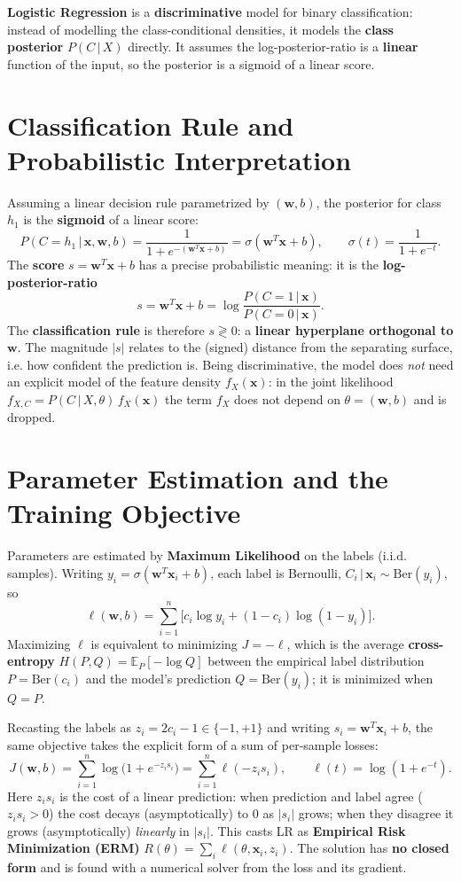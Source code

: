 \textbf{Logistic Regression} is a \textbf{discriminative} model for binary classification: instead of modelling the class-conditional densities, it models the \textbf{class posterior} $P(C\,|\,X)$ directly. It assumes the log-posterior-ratio is a \textbf{linear} function of the input, so the posterior is a sigmoid of a linear score.

\section*{Classification Rule and Probabilistic Interpretation}

Assuming a linear decision rule parametrized by $(\mathbf{w},b)$, the posterior for class $h_1$ is the \textbf{sigmoid} of a linear score:
\[
P(C{=}h_1\,|\,\mathbf{x},\mathbf{w},b)=\frac{1}{1+e^{-(\mathbf{w}^T\mathbf{x}+b)}}=\sigma(\mathbf{w}^T\mathbf{x}+b),\qquad \sigma(t)=\frac{1}{1+e^{-t}} .
\]
The \textbf{score} $s=\mathbf{w}^T\mathbf{x}+b$ has a precise probabilistic meaning: it is the \textbf{log-posterior-ratio}
\[
s=\mathbf{w}^T\mathbf{x}+b=\log\frac{P(C{=}1\,|\,\mathbf{x})}{P(C{=}0\,|\,\mathbf{x})} .
\]
The \textbf{classification rule} is therefore $s\gtrless 0$: a \textbf{linear hyperplane orthogonal to $\mathbf{w}$}. The magnitude $|s|$ relates to the (signed) distance from the separating surface, i.e. how confident the prediction is. Being discriminative, the model does \emph{not} need an explicit model of the feature density $f_X(\mathbf{x})$: in the joint likelihood $f_{X,C}=P(C\,|\,X,\theta)\,f_X(\mathbf{x})$ the term $f_X$ does not depend on $\theta=(\mathbf{w},b)$ and is dropped.

\section*{Parameter Estimation and the Training Objective}

Parameters are estimated by \textbf{Maximum Likelihood} on the labels (i.i.d. samples). Writing $y_i=\sigma(\mathbf{w}^T\mathbf{x}_i+b)$, each label is Bernoulli, $C_i\,|\,\mathbf{x}_i\sim\mathrm{Ber}(y_i)$, so
\[
\ell(\mathbf{w},b)=\sum_{i=1}^n\big[c_i\log y_i+(1-c_i)\log(1-y_i)\big].
\]
Maximizing $\ell$ is equivalent to minimizing $J=-\ell$, which is the average \textbf{cross-entropy} $H(P,Q)=\mathbb{E}_P[-\log Q]$ between the empirical label distribution $P=\mathrm{Ber}(c_i)$ and the model's prediction $Q=\mathrm{Ber}(y_i)$; it is minimized when $Q=P$.

Recasting the labels as $z_i=2c_i-1\in\{-1,+1\}$ and writing $s_i=\mathbf{w}^T\mathbf{x}_i+b$, the same objective takes the explicit form of a sum of per-sample losses:
\[
J(\mathbf{w},b)=\sum_{i=1}^n\log\!\big(1+e^{-z_i s_i}\big)=\sum_{i=1}^n\ell(-z_i s_i),\qquad \ell(t)=\log(1+e^{-t}).
\]
Here $z_is_i$ is the cost of a linear prediction: when prediction and label agree ($z_is_i>0$) the cost decays (asymptotically) to $0$ as $|s_i|$ grows; when they disagree it grows (asymptotically) \emph{linearly} in $|s_i|$. This casts LR as \textbf{Empirical Risk Minimization (ERM)} $R(\theta)=\sum_i\ell(\theta,\mathbf{x}_i,z_i)$. The solution has \textbf{no closed form} and is found with a numerical solver from the loss and its gradient.

